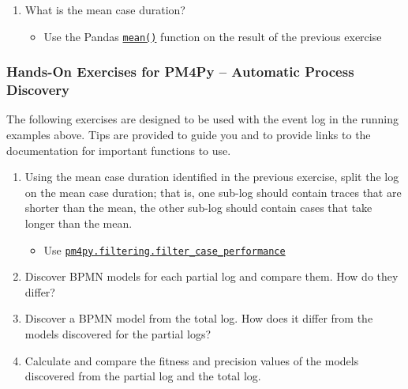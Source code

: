 \begin{tcolorbox}[colback=code]
\begin{enumerate}
\begin{itemize}
    \end{itemize}
    \item What is the mean case duration?
    \begin{itemize}
       \item Use the Pandas \href{https://pandas.pydata.org/docs/reference/api/pandas.DataFrame.mean.html}{\texttt{mean()}} function on the result of the previous exercise
    \end{itemize}
\end{enumerate}
\end{tcolorbox}

\begin{tcolorbox}[colback=code]
\subsubsection*{Hands-On Exercises for PM4Py -- Automatic Process Discovery}

The following exercises are designed to be used with the event log in the running examples above. Tips are provided to guide you and to provide links to the documentation for important functions to use.

\begin{enumerate}
    \item Using the mean case duration identified in the previous exercise, split the log on the mean case duration; that is, one sub-log should contain traces that are shorter than the mean, the other sub-log should contain cases that take longer than the mean.
    \begin{itemize}
       \item Use \href{https://processintelligence.solutions/static/api/2.7.11/generated/pm4py.filtering.filter_case_performance.html}{\texttt{pm4py.filtering.filter\_case\_performance}}
    \end{itemize}
    \item Discover BPMN models for each partial log and compare them. How do they differ?
    \item Discover a BPMN model from the total log. How does it differ from the models discovered for the partial logs?
    \item Calculate and compare the fitness and precision values of the models discovered from the partial log and the total log.
\end{enumerate}
\end{tcolorbox}

